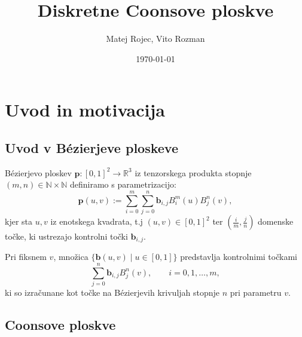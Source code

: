 \documentclass[a4paper,12pt]{article}
\begin{document}
\newcommand{\N}{\mathbb{N}}
\newcommand{\R}{\mathbb{R}}
\newcommand\sbullet[1][.5]{\mathbin{\vcenter{\hbox{\scalebox{#1}{$\bullet$}}}}}


\title{Diskretne Coonsove ploskve}
\author{Matej Rojec, Vito Rozman}
\date{\today}

\maketitle


\newpage

\tableofcontents
\listoffigures

\newpage

\section{Uvod in motivacija}

\subsection{Uvod v Bézierjeve ploskeve}
Bézierjevo ploskev $\mathbf{p} : [0,1]^2 \rightarrow \R^3$ iz tenzorskega produkta stopnje $(m, n) \in \N \times \N$  
definiramo s parametrizacijo:
$$\mathbf{p}(u,v) := \sum_{i=0}^m \sum_{j=0}^n \mathbf{b}_{i,j} B_i^m(u)B_j^n(v),$$
kjer sta $u,v$ iz enotskega kvadrata, t.j $(u,v) \in [0,1]^2$ ter $(\frac{i}{m}, \frac{j}{n})$
domenske točke, ki ustrezajo kontrolni točki $\mathbf{b}_{i,j}$.

Pri fiksnem $v$, množica $\{\mathbf{b} (u,v) \mid u \in [0,1]  \}$ predstavlja 
kontrolnimi točkami
$$\sum_{j=0}^n \mathbf{b}_{i,j} B_j^n(v), \qquad i=0,1,\ldots,m,$$
ki so izračunane kot točke na Bézierjevih krivuljah stopnje $n$ pri parametru $v$.


\subsection{Coonsove ploskve}
\end{document}
